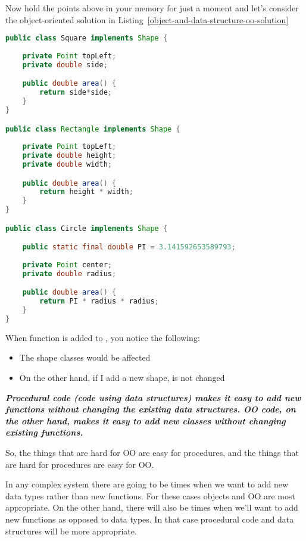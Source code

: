 Now hold the points above in your memory for just a moment and let's consider the object-oriented solution in Listing~\ref{object-and-data-structure-oo-solution} 

\begin{tcolorbox}[breakable, colback=green!10!white, colframe=green!85!black, label = object-and-data-structure-oo-solution]
\begin{lstlisting}[language = java, basicstyle=\small]
public class Square implements Shape {
    
    private Point topLeft;
    private double side;

    public double area() {
        return side*side;
    }
}

public class Rectangle implements Shape {
    
    private Point topLeft;
    private double height;
    private double width;

    public double area() {
        return height * width;
    }
}

public class Circle implements Shape {

    public static final double PI = 3.141592653589793;
    
    private Point center;
    private double radius;

    public double area() {
        return PI * radius * radius;
    }
}
\end{lstlisting}
\end{tcolorbox}

When  function is added to , you notice the following:

\begin{itemize}
    \item The shape classes would be affected
    \item On the other hand, if I add a new shape,   is not changed
\end{itemize}

\textit{\textbf{Procedural code (code using data structures) makes it easy to add new functions without changing the existing data structures. OO code, on the other hand, makes it easy to add new classes without changing existing functions.}}

So, the things that are hard for OO are easy for procedures, and the things that are hard for procedures are easy for OO.

In any complex system there are going to be times when we want to add new data
types rather than new functions. For these cases objects and OO are most appropriate. On the other hand, there will also be times when we'll want to add new functions as opposed to data types. In that case procedural code and data structures will be more appropriate.

